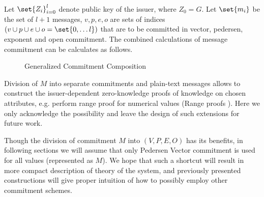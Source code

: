 \begin{corollary}
Let $\set{Z_i}_{i=0}^l$ denote public key of the issuer, where $Z_0 = G$.
Let $\set{m_i}$ be the set of $l + 1$ messages, $v, p, e, o$ are sets of indices $(v \cup p \cup e \cup o = \set{0, \dots l})$ that are to be committed in vector, pedersen, exponent and open commitment. The combined calculations of message commitment can be calculates as follows.

\begin{figure}[H]
\centering
{}
\caption{Generalized Commitment Composition}
\label{proto:generalized-commitment-composition}
\end{figure}
\end{corollary}

\begin{remark}
Division of $M$ into separate commitments and plain-text messages allows to construct the issuer-dependent zero-knowledge proofs of knowledge on chosen attributes, e.g. perform range proof for numerical values (Range proofs \cite{bulletproofs}). Here we only acknowledge the possibility and leave the design of such extensions for future work.
\end{remark}

Though the division of commitment $M$ into $(V, P, E, O)$ has its benefits, in following sections we will assume that only Pedersen Vector commitment is used for all values (represented as $M$). We hope that such a shortcut will result in more compact description of theory of the system, and previously presented constructions will give proper intuition of how to possibly employ other commitment schemes.


